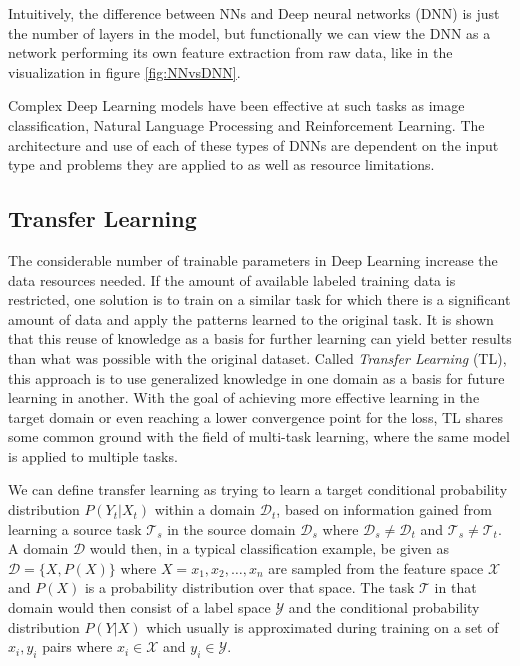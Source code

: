 Intuitively, the difference between NNs and Deep neural networks (DNN) is just the number of layers in the model, but functionally we can view the DNN as a network performing its own feature extraction from raw data, like in the visualization in figure \ref{fig:NNvsDNN}. 

Complex Deep Learning models have been effective at such tasks as image classification\cite{imageclassification}, Natural Language Processing\cite{deepnlp} and Reinforcement Learning\cite{deepreinforcementlearning}. The architecture and use of each of these types of DNNs are dependent on the input type and problems they are applied to as well as resource limitations.

\subsection{Transfer Learning}
\label{background:TL}
The considerable number of trainable parameters in Deep Learning increase the data resources needed. If the amount of available labeled training data is restricted, one solution is to train on a similar task for which there is a significant amount of data and apply the patterns learned to the original task. It is shown that this reuse of knowledge as a basis for further learning can yield better results than what was possible with the original dataset\cite{pathnet, progressiveneuralnetworks, tradaboost}. Called \textit{Transfer Learning} (TL), this approach is to use generalized knowledge in one domain as a basis for future learning in another. With the goal of achieving more effective learning in the target domain or even reaching a lower convergence point for the loss, TL shares some common ground with the field of multi-task learning, where the same model is applied to multiple tasks. 

We can define transfer learning as trying to learn a target conditional probability distribution \(P(Y_{t}|X_{t})\) within a domain \(\mathcal{D}_{t}\), based on information gained from learning a source task \(\mathcal{T}_{s}\) in the source domain \(\mathcal{D}_{s}\) where \(\mathcal{D}_{s} \neq \mathcal{D}_{t}\) and \(\mathcal{T}_{s} \neq \mathcal{T}_{t}\). A domain \(\mathcal{D}\) would then, in a typical classification example, be given as \(\mathcal{D} = \{X, P(X)\}\) where \(X = x_{1},x_{2}, \dotsc ,x_{n}\) are sampled from the feature space \(\mathcal{X}\) and \(P(X)\) is a probability distribution over that space. The task \(\mathcal{T}\) in that domain would then consist of a label space \(\mathcal{Y}\) and the conditional probability distribution \(P(Y|X)\) which usually is approximated during training on a set of \(x_{i}, y_{i}\) pairs where \(x_{i} \in \mathcal{X}\) and \(y_{i} \in \mathcal{Y}\).

